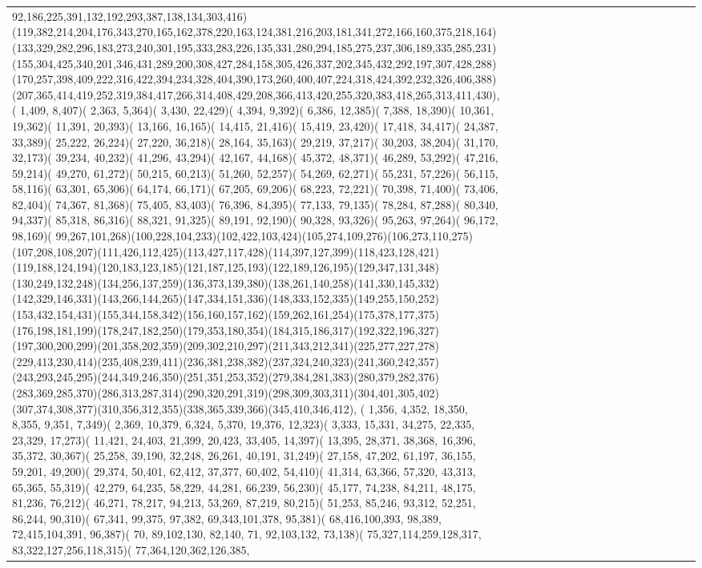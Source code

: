 \documentclass[varwidth=\maxdimen,border=10]{standalone}
\begin{document}
\begin{tabular}{@{}l@{}l@{}l@{}l@{}l@{}l@{}l@{}l@{}l@{}l@{}l@{}l@{}l@{}l@{}l@{}l@{}l@{}l@{}}
92,186,225,391,132,192,293,387,138,134,303,416)(119,382,214,204,176,343,270,165,162,378,220,163,124,381,216,203,181,341,272,166,160,375,218,164)(133,329,282,296,183,273,240,301,195,333,283,226,135,331,280,294,185,275,237,306,189,335,285,231)(155,304,425,340,201,346,431,289,200,308,427,284,158,305,426,337,202,345,432,292,197,307,428,288)(170,257,398,409,222,316,422,394,234,328,404,390,173,260,400,407,224,318,424,392,232,326,406,388)(207,365,414,419,252,319,384,417,266,314,408,429,208,366,413,420,255,320,383,418,265,313,411,430), (  1,409,  8,407)(  2,363,  5,364)(  3,430, 22,429)(  4,394,  9,392)(  6,386, 12,385)(  7,388, 18,390)( 10,361, 19,362)( 11,391, 20,393)( 13,166, 16,165)( 14,415, 21,416)( 15,419, 23,420)( 17,418, 34,417)( 24,387, 33,389)( 25,222, 26,224)( 27,220, 36,218)( 28,164, 35,163)( 29,219, 37,217)( 30,203, 38,204)( 31,170, 32,173)( 39,234, 40,232)( 41,296, 43,294)( 42,167, 44,168)( 45,372, 48,371)( 46,289, 53,292)( 47,216, 59,214)( 49,270, 61,272)( 50,215, 60,213)( 51,260, 52,257)( 54,269, 62,271)( 55,231, 57,226)( 56,115, 58,116)( 63,301, 65,306)( 64,174, 66,171)( 67,205, 69,206)( 68,223, 72,221)( 70,398, 71,400)( 73,406, 82,404)( 74,367, 81,368)( 75,405, 83,403)( 76,396, 84,395)( 77,133, 79,135)( 78,284, 87,288)( 80,340, 94,337)( 85,318, 86,316)( 88,321, 91,325)( 89,191, 92,190)( 90,328, 93,326)( 95,263, 97,264)( 96,172, 98,169)( 99,267,101,268)(100,228,104,233)(102,422,103,424)(105,274,109,276)(106,273,110,275)(107,208,108,207)(111,426,112,425)(113,427,117,428)(114,397,127,399)(118,423,128,421)(119,188,124,194)(120,183,123,185)(121,187,125,193)(122,189,126,195)(129,347,131,348)(130,249,132,248)(134,256,137,259)(136,373,139,380)(138,261,140,258)(141,330,145,332)(142,329,146,331)(143,266,144,265)(147,334,151,336)(148,333,152,335)(149,255,150,252)(153,432,154,431)(155,344,158,342)(156,160,157,162)(159,262,161,254)(175,378,177,375)(176,198,181,199)(178,247,182,250)(179,353,180,354)(184,315,186,317)(192,322,196,327)(197,300,200,299)(201,358,202,359)(209,302,210,297)(211,343,212,341)(225,277,227,278)(229,413,230,414)(235,408,239,411)(236,381,238,382)(237,324,240,323)(241,360,242,357)(243,293,245,295)(244,349,246,350)(251,351,253,352)(279,384,281,383)(280,379,282,376)(283,369,285,370)(286,313,287,314)(290,320,291,319)(298,309,303,311)(304,401,305,402)(307,374,308,377)(310,356,312,355)(338,365,339,366)(345,410,346,412), (  1,356,  4,352, 18,350,  8,355,  9,351,  7,349)(  2,369, 10,379,  6,324,  5,370, 19,376, 12,323)(  3,333, 15,331, 34,275, 22,335, 23,329, 17,273)( 11,421, 24,403, 21,399, 20,423, 33,405, 14,397)( 13,395, 28,371, 38,368, 16,396, 35,372, 30,367)( 25,258, 39,190, 32,248, 26,261, 40,191, 31,249)( 27,158, 47,202, 61,197, 36,155, 59,201, 49,200)( 29,374, 50,401, 62,412, 37,377, 60,402, 54,410)( 41,314, 63,366, 57,320, 43,313, 65,365, 55,319)( 42,279, 64,235, 58,229, 44,281, 66,239, 56,230)( 45,177, 74,238, 84,211, 48,175, 81,236, 76,212)( 46,271, 78,217, 94,213, 53,269, 87,219, 80,215)( 51,253, 85,246, 93,312, 52,251, 86,244, 90,310)( 67,341, 99,375, 97,382, 69,343,101,378, 95,381)( 68,416,100,393, 98,389, 72,415,104,391, 96,387)( 70, 89,102,130, 82,140, 71, 92,103,132, 73,138)( 75,327,114,259,128,317, 83,322,127,256,118,315)( 77,364,120,362,126,385, 
\end{tabular}
\end{document}
